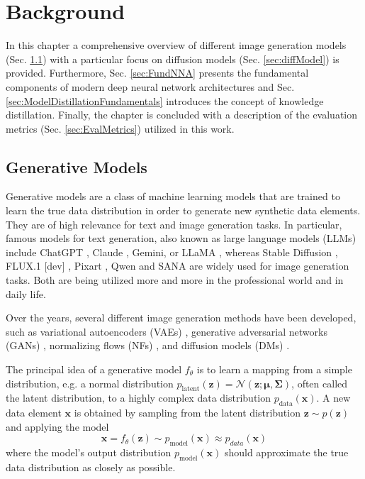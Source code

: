 \chapter{Background}
\label{sec:Background}
In this chapter a comprehensive overview of different image generation models (Sec. \ref{sec:GenerativeModels}) with a particular focus on diffusion models (Sec. \ref{sec:diffModel}) is provided. Furthermore, Sec. \ref{sec:FundNNA} presents the fundamental components of modern deep neural network architectures and Sec. \ref{sec:ModelDistillationFundamentals} introduces the concept of knowledge distillation. Finally, the chapter is concluded with a description of the evaluation metrics (Sec. \ref{sec:EvalMetrics}) utilized in this work.
\section{Generative Models}
\label{sec:GenerativeModels}
Generative models are a class of machine learning models that are trained to learn the true data distribution in order to generate new synthetic data elements. They are of high relevance for text and image generation tasks. In particular, famous models for text generation, also known as large language models (\gls{LLM}s) include ChatGPT \cite{GPT4}, Claude \cite{Claude}, Gemini, \cite{Gemini} or LLaMA \cite{Lama}, whereas Stable Diffusion \cite{ SDXL, SD21}, FLUX.1 [dev] \cite{Flux}, Pixart \cite{Pixart_s}, Qwen \cite{wu2025qwen} and SANA \cite{Sana} are widely used for  image generation tasks. Both are being utilized more and more in the professional world and in daily life. 

Over the years, several different image generation methods have been developed, such as variational autoencoders (\gls{VAE}s) \cite{VAE}, generative adversarial networks (\gls{GAN}s) \cite{GAN, ConvGAN}, normalizing flows (\gls{NF}s) \cite{NormalizingFlow}, and diffusion models (\gls{DM}s) \cite{DMBeginning}. 

The principal idea of a generative model $f_\theta$ is to learn a mapping from a simple distribution, e.g. a normal distribution $p_{\text{latent}}(\textbf{z}) = \mathcal{N}(\textbf{z}; \boldsymbol{\mu}, \boldsymbol{\Sigma})$, often called the latent distribution, to a highly complex data distribution $p_{\text{data}}(\textbf{x})$. A new data element $\textbf{x}$ is obtained  by sampling from the latent distribution $\textbf{z} \sim p(\textbf{z})$ and applying the model
\begin{equation}
\textbf{x} = f_\theta(\textbf{z}) \sim p_{\text{model}}(\textbf{x}) \approx p_{data}(\textbf{x})
\end{equation}
where the model's output distribution $p_{\text{model}}(\textbf{x})$ should approximate the true data distribution as closely as possible. 


